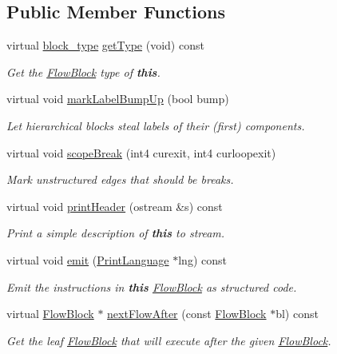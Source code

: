 \subsection*{Public Member Functions}
\begin{DoxyCompactItemize}
\item 
virtual \mbox{\hyperlink{class_flow_block_a70df78390870fcdd51e31426ba6a193e}{block\+\_\+type}} \mbox{\hyperlink{class_block_inf_loop_a798896823e2c790567144b525753eca7}{get\+Type}} (void) const
\begin{DoxyCompactList}\small\item\em Get the \mbox{\hyperlink{class_flow_block}{Flow\+Block}} type of {\bfseries{this}}. \end{DoxyCompactList}\item 
virtual void \mbox{\hyperlink{class_block_inf_loop_a4b07279f936c69240ceacf4d5e8dfebc}{mark\+Label\+Bump\+Up}} (bool bump)
\begin{DoxyCompactList}\small\item\em Let hierarchical blocks steal labels of their (first) components. \end{DoxyCompactList}\item 
virtual void \mbox{\hyperlink{class_block_inf_loop_ad1f92e4b37d7bf19cc409d353ad281ae}{scope\+Break}} (int4 curexit, int4 curloopexit)
\begin{DoxyCompactList}\small\item\em Mark unstructured edges that should be {\itshape breaks}. \end{DoxyCompactList}\item 
virtual void \mbox{\hyperlink{class_block_inf_loop_a52090deeaa2673ea5afedca0331d3027}{print\+Header}} (ostream \&s) const
\begin{DoxyCompactList}\small\item\em Print a simple description of {\bfseries{this}} to stream. \end{DoxyCompactList}\item 
virtual void \mbox{\hyperlink{class_block_inf_loop_aa86634144acbb9f7b6b580b9f4566bfe}{emit}} (\mbox{\hyperlink{class_print_language}{Print\+Language}} $\ast$lng) const
\begin{DoxyCompactList}\small\item\em Emit the instructions in {\bfseries{this}} \mbox{\hyperlink{class_flow_block}{Flow\+Block}} as structured code. \end{DoxyCompactList}\item 
virtual \mbox{\hyperlink{class_flow_block}{Flow\+Block}} $\ast$ \mbox{\hyperlink{class_block_inf_loop_a10ef0de99961f931b7432b2662ac2677}{next\+Flow\+After}} (const \mbox{\hyperlink{class_flow_block}{Flow\+Block}} $\ast$bl) const
\begin{DoxyCompactList}\small\item\em Get the leaf \mbox{\hyperlink{class_flow_block}{Flow\+Block}} that will execute after the given \mbox{\hyperlink{class_flow_block}{Flow\+Block}}. \end{DoxyCompactList}\end{DoxyCompactItemize}
